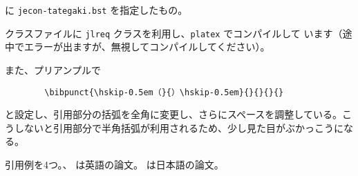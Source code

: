 \documentclass[article,tate,dvipdfmx]{jlreq}
\begin{document}
\verb|| に \verb|jecon-tategaki.bst| を指定したもの。
\vspace*{1em}

クラスファイルに \texttt{jlreq} クラスを利用し、\texttt{platex} でコンパイルして
います（途中でエラーが出ますが、無視してコンパイルしてください）。

\vspace*{1em}

また、プリアンプルで
\begin{verbatim}
        \bibpunct{\hskip-0.5em（}{）\hskip-0.5em}{}{}{}{}
\end{verbatim}
と設定し、引用部分の括弧を全角に変更し、さらにスペースを調整している。こ
うしないと引用部分で半角括弧が利用されるため、少し見た目がぶかっこうにな
る。

\vspace*{1em}

引用例を4つ。\citet{ishikawa03:_green_gas_emiss_contr_open_econom}、
\citet{takeda06:_cge_analy_welfar_effec_trade} は英語の論文。
\citet{oyama99:_mark_stru}  \citet{kuroda97jp:keo} は日本語の論文。

\nocite{*}



%

\end{document}
